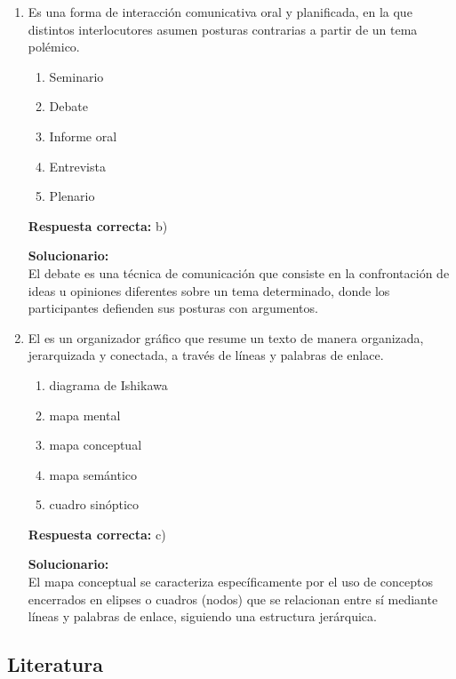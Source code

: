 \begin{enumerate}
	\item Es una forma de interacción comunicativa oral y planificada, en la que distintos interlocutores asumen posturas contrarias a partir de un tema polémico.
	\begin{enumerate}[label=\alph*)]
		\item Seminario
		\item Debate
		\item Informe oral
		\item Entrevista
		\item Plenario
	\end{enumerate}
	\textbf{Respuesta correcta:} b)
	
	\vspace{2mm}
	\textbf{Solucionario:}\\
	El debate es una técnica de comunicación que consiste en la confrontación de ideas u opiniones diferentes sobre un tema determinado, donde los participantes defienden sus posturas con argumentos.
	
	\vspace{6mm}
	
	\item El \underline{\hspace{3cm}} es un organizador gráfico que resume un texto de manera organizada, jerarquizada y conectada, a través de líneas y palabras de enlace.
	\begin{enumerate}[label=\alph*)]
		\item diagrama de Ishikawa
		\item mapa mental
		\item mapa conceptual
		\item mapa semántico
		\item cuadro sinóptico
	\end{enumerate}
	\textbf{Respuesta correcta:} c)
	
	\vspace{2mm}
	\textbf{Solucionario:}\\
	El mapa conceptual se caracteriza específicamente por el uso de conceptos encerrados en elipses o cuadros (nodos) que se relacionan entre sí mediante líneas y palabras de enlace, siguiendo una estructura jerárquica.
	
	\vspace{6mm}
	
\end{enumerate}


\subsection*{Literatura}

